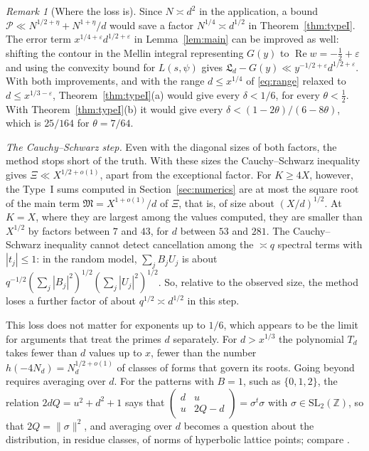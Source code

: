 \documentclass[11pt]{amsart}
\theoremstyle{remark}
\newtheorem{remark}[theorem]{Remark}
\theoremstyle{definition}
\numberwithin{equation}{section}
\newcommand{\Pc}{\mathcal{P}}
\newcommand{\Z}{\mathbb{Z}}
\newcommand{\eps}{\varepsilon}
\newcommand{\Lf}{\mathfrak{L}}
\newcommand{\SL}{\mathrm{SL}}
\begin{document}
\begin{remark}[Where the loss is]
Since $N\asymp d^2$ in the application, a bound $\Pc\ll N^{1/2+\eta}+N^{1+\eta}/d$ would save a factor $N^{1/4}\asymp d^{1/2}$ in Theorem~\ref{thm:typeI}. The error term $x^{1/4+\eps}d^{1/2+\eps}$ in Lemma~\ref{lem:main} can be improved as well: shifting the contour in the Mellin integral representing $G(y)$ to $\operatorname{Re}w=-\frac12+\eps$ and using the convexity bound for $L(s,\psi)$ gives $\Lf_d-G(y)\ll y^{-1/2+\eps}d^{1/2+\eps}$. With both improvements, and with the range $d\le x^{1/4}$ of \eqref{eq:range} relaxed to $d\le x^{1/3-\eps}$, Theorem~\ref{thm:typeI}(a) would give every $\delta<1/6$, for every $\theta<\frac12$. With Theorem~\ref{thm:typeI}(b) it would give every $\delta<(1-2\theta)/(6-8\theta)$, which is $25/164$ for $\theta=7/64$.

\emph{The Cauchy--Schwarz step.} Even with the diagonal sizes of both factors, the method stops short of the truth. With these sizes the Cauchy--Schwarz inequality gives $\Xi\ll X^{1/2+o(1)}$, apart from the exceptional factor. For $K\ge4X$, however, the Type~I sums computed in Section~\ref{sec:numerics} are at most the square root of the main term $\mathfrak M=X^{1+o(1)}/d$ of $\Xi$, that is, of size about $(X/d)^{1/2}$. At $K=X$, where they are largest among the values computed, they are smaller than $X^{1/2}$ by factors between $7$ and $43$, for $d$ between $53$ and $281$. The Cauchy--Schwarz inequality cannot detect cancellation among the $\asymp q$ spectral terms with $|t_j|\le1$: in the random model, $\sum_jB_jU_j$ is about $q^{-1/2}(\sum_j|B_j|^2)^{1/2}(\sum_j|U_j|^2)^{1/2}$. So, relative to the observed size, the method loses a further factor of about $q^{1/2}\asymp d^{1/2}$ in this step.

This loss does not matter for exponents up to $1/6$, which appears to be the limit for arguments that treat the primes $d$ separately. For $d>x^{1/3}$ the polynomial $T_d$ takes fewer than $d$ values up to $x$, fewer than the number $h(-4N_d)=N_d^{1/2+o(1)}$ of classes of forms that govern its roots. Going beyond requires averaging over $d$. For the patterns with $B=1$, such as $\{0,1,2\}$, the relation $2dQ=u^2+d^2+1$ says that $\left(\begin{smallmatrix}d&u\\u&2Q-d\end{smallmatrix}\right)=\sigma^t\sigma$ with $\sigma\in\SL_2(\Z)$, so that $2Q=\|\sigma\|^2$, and averaging over $d$ becomes a question about the distribution, in residue classes, of norms of hyperbolic lattice points; compare \cite{FI09}.
\end{remark}
\end{document}
